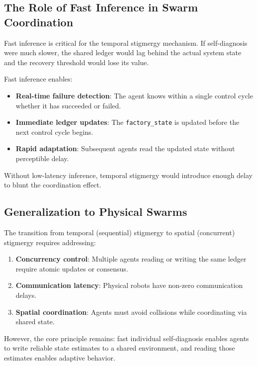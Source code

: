 \documentclass[12pt,a4paper,oneside]{report}
\begin{document}
\subsection{The Role of Fast Inference in Swarm Coordination}
\label{subsec:the_role_of_fast_inference_in_swarm_coordination}

Fast inference is critical for the temporal stigmergy mechanism. If self-diagnosis were much slower, the shared ledger would lag behind the actual system state and the recovery threshold would lose its value.

Fast inference enables:
\begin{itemize}
    \item \textbf{Real-time failure detection}: The agent knows within a single control cycle whether it has succeeded or failed.
    \item \textbf{Immediate ledger updates}: The \texttt{factory\_state} is updated before the next control cycle begins.
    \item \textbf{Rapid adaptation}: Subsequent agents read the updated state without perceptible delay.
\end{itemize}

Without low-latency inference, temporal stigmergy would introduce enough delay to blunt the coordination effect.

\subsection{Generalization to Physical Swarms}
\label{subsec:generalization_to_physical_swarms}

The transition from temporal (sequential) stigmergy to spatial (concurrent) stigmergy requires addressing:
\begin{enumerate}
    \item \textbf{Concurrency control}: Multiple agents reading or writing the same ledger require atomic updates or consensus.
    \item \textbf{Communication latency}: Physical robots have non-zero communication delays.
    \item \textbf{Spatial coordination}: Agents must avoid collisions while coordinating via shared state.
\end{enumerate}

However, the core principle remains: fast individual self-diagnosis enables agents to write reliable state estimates to a shared environment, and reading those estimates enables adaptive behavior.
\end{document}
